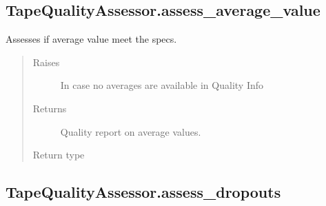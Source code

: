 \documentclass[letterpaper,10pt,english]{sphinxmanual}
\begin{document}
\begin{fulllineitems}
\subsection{TapeQualityAssessor.assess\_average\_value}
\label{\detokenize{generated/quality_assessment.quality_assessor.TapeQualityAssessor.assess_average_value:tapequalityassessor-assess-average-value}}\label{\detokenize{generated/quality_assessment.quality_assessor.TapeQualityAssessor.assess_average_value::doc}}

\begin{fulllineitems}
\label{\detokenize{generated/quality_assessment.quality_assessor.TapeQualityAssessor.assess_average_value:quality_assessment.quality_assessor.TapeQualityAssessor.assess_average_value}}
\sphinxAtStartPar
Assesses if average value meet the specs.
\begin{quote}\begin{description}
\item[{Raises}] \leavevmode
\sphinxAtStartPar
{} \textendash{} In case no averages are available in Quality Info

\item[{Returns}] \leavevmode
\sphinxAtStartPar
Quality report on average values.

\item[{Return type}] \leavevmode
\sphinxAtStartPar
{\hyperref[\detokenize{generated/quality_assessment.data_types.QualityReport:quality_assessment.data_types.QualityReport}]{}}

\end{description}\end{quote}

\end{fulllineitems}



\subsection{TapeQualityAssessor.assess\_dropouts}
\label{\detokenize{generated/quality_assessment.quality_assessor.TapeQualityAssessor.assess_dropouts:tapequalityassessor-assess-dropouts}}\label{\detokenize{generated/quality_assessment.quality_assessor.TapeQualityAssessor.assess_dropouts::doc}}


\end{fulllineitems}
\end{document}
